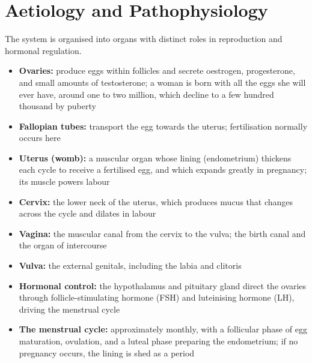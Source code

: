 \section*{Aetiology and Pathophysiology}
The system is organised into organs with distinct roles in reproduction and hormonal regulation.
\begin{itemize}
    \item \textbf{Ovaries:} produce eggs within follicles and secrete oestrogen, progesterone, and small amounts of testosterone; a woman is born with all the eggs she will ever have, around one to two million, which decline to a few hundred thousand by puberty
    \item \textbf{Fallopian tubes:} transport the egg towards the uterus; fertilisation normally occurs here
    \item \textbf{Uterus (womb):} a muscular organ whose lining (endometrium) thickens each cycle to receive a fertilised egg, and which expands greatly in pregnancy; its muscle powers labour
    \item \textbf{Cervix:} the lower neck of the uterus, which produces mucus that changes across the cycle and dilates in labour
    \item \textbf{Vagina:} the muscular canal from the cervix to the vulva; the birth canal and the organ of intercourse
    \item \textbf{Vulva:} the external genitals, including the labia and clitoris
    \item \textbf{Hormonal control:} the hypothalamus and pituitary gland direct the ovaries through follicle-stimulating hormone (FSH) and luteinising hormone (LH), driving the menstrual cycle
    \item \textbf{The menstrual cycle:} approximately monthly, with a follicular phase of egg maturation, ovulation, and a luteal phase preparing the endometrium; if no pregnancy occurs, the lining is shed as a period
\end{itemize}

